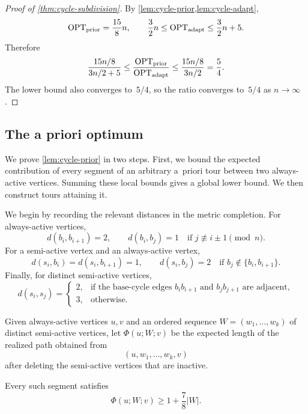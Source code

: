 \documentclass[12pt,a4paper,oneside]{report}
\begin{document}
\begin{proof}[Proof of \cref{thm:cycle-subdivision}]
By \cref{lem:cycle-prior,lem:cycle-adapt},
\[
    \operatorname{OPT}_\mathrm{prior}=\frac{15}{8}n,
    \qquad
    \frac32n\le\operatorname{OPT}_\mathrm{adapt}\le\frac32n+5.
\]
Therefore
\[
    \frac{15n/8}{3n/2+5}
    \le
    \frac{\operatorname{OPT}_\mathrm{prior}}{\operatorname{OPT}_\mathrm{adapt}}
    \le
    \frac{15n/8}{3n/2}
    =\frac54.
\]
The lower bound also converges to~$5/4$, so the ratio converges to~$5/4$ as
$n\to\infty$.
\end{proof}


\subsection{The a priori optimum}
\label{sec:cycle-prior}
We prove \cref{lem:cycle-prior} in two steps.  First, we bound the
expected contribution of every segment of an arbitrary a~priori tour between
two always-active vertices.  Summing these local bounds gives a global lower
bound.  We then construct tours attaining it.

We begin by recording the relevant distances in the metric completion.  For
always-active vertices,
\begin{equation}\label{eq:cycle-base-distances}
    d(b_i,b_{i+1})=2,
    \qquad
    d(b_i,b_j)=1
    \quad\text{if }j\not\equiv i\pm1\pmod n.
\end{equation}
For a semi-active vertex and an always-active vertex,
\begin{equation}\label{eq:cycle-mixed-distances}
    d(s_i,b_i)=d(s_i,b_{i+1})=1,
    \qquad
    d(s_i,b_j)=2
    \quad\text{if }b_j\notin\{b_i,b_{i+1}\}.
\end{equation}
Finally, for distinct semi-active vertices,
\begin{equation}\label{eq:cycle-subdivision-distances}
    d(s_i,s_j)
    =
    \begin{cases}
        2, & \text{if the base-cycle edges }b_ib_{i+1}
             \text{ and }b_jb_{j+1}\text{ are adjacent},\\
        3, & \text{otherwise.}
    \end{cases}
\end{equation}

Given always-active vertices $u,v$ and an ordered sequence
$W=(w_1,\dots,w_k)$ of distinct semi-active vertices, let
$\Phi(u;W;v)$ be the expected length of the realized path obtained from
\[
    (u,w_1,\dots,w_k,v)
\]
after deleting the semi-active vertices that are inactive.

\begin{lemma}\label{lem:cycle-segment-bound}
Every such segment satisfies
\[
    \Phi(u;W;v)\ge 1+\frac{7}{8}|W|.
\]
\end{lemma}
\end{document}
